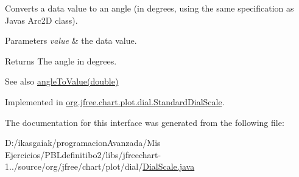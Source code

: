 Converts a data value to an angle (in degrees, using the same specification as Java\textquotesingle{}s Arc2D class).


\begin{DoxyParams}{Parameters}
{\em value} & the data value.\\
\hline
\end{DoxyParams}
\begin{DoxyReturn}{Returns}
The angle in degrees.
\end{DoxyReturn}
\begin{DoxySeeAlso}{See also}
\mbox{\hyperlink{interfaceorg_1_1jfree_1_1chart_1_1plot_1_1dial_1_1_dial_scale_a53cbe3e0ce73e266dab63941474cc343}{angle\+To\+Value(double)}} 
\end{DoxySeeAlso}


Implemented in \mbox{\hyperlink{classorg_1_1jfree_1_1chart_1_1plot_1_1dial_1_1_standard_dial_scale_a6ae0ce846561db45890b0c345e4e8d0e}{org.\+jfree.\+chart.\+plot.\+dial.\+Standard\+Dial\+Scale}}.



The documentation for this interface was generated from the following file\+:\begin{DoxyCompactItemize}
\item 
D\+:/ikasgaiak/programacion\+Avanzada/\+Mis Ejercicios/\+P\+B\+Ldefinitibo2/libs/jfreechart-\/1../source/org/jfree/chart/plot/dial/\mbox{\hyperlink{_dial_scale_8java}{Dial\+Scale.\+java}}\end{DoxyCompactItemize}
